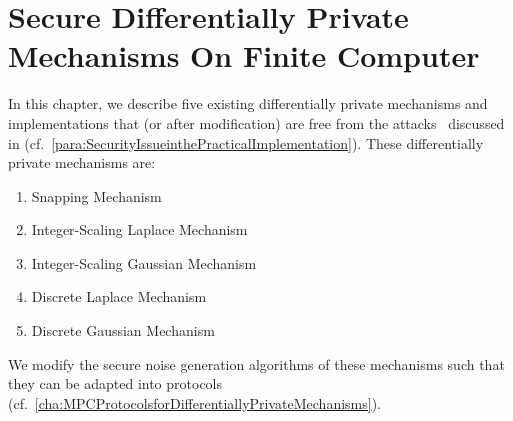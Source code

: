 \chapter{Secure Differentially Private Mechanisms On Finite Computer}
\label{cha:secureDPMechanisms}

In this chapter, we describe five existing differentially private mechanisms and implementations that (or after modification) are free from the attacks~\cite{mironov2012significance,jin2022we} discussed in (cf.~\autoref{para:SecurityIssueinthePracticalImplementation}).
These differentially private mechanisms are:
\begin{enumerate}
    \item Snapping Mechanism~\cite{mironov2012significance}
    \item Integer-Scaling Laplace Mechanism~\cite{googleDP2019}
    \item Integer-Scaling Gaussian Mechanism~\cite{googleDP2019}
    \item Discrete Laplace Mechanism~\cite{ghosh2012universally,canonne2020discrete}
    \item Discrete Gaussian Mechanism~\cite{canonne2020discrete}
\end{enumerate}

We modify the secure noise generation algorithms of these mechanisms such that they can be adapted into \smpc protocols (cf.~\autoref{cha:MPCProtocolsforDifferentiallyPrivateMechanisms}).











